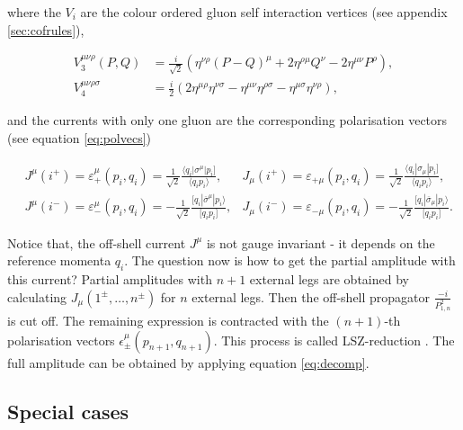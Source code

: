 \documentclass{article}
\theoremstyle{definition}
\numberwithin{equation}{section}
\begin{document}
where the $V_i$ are the colour ordered gluon self interaction vertices (see appendix \ref{sec:cofrules}),

\begin{align}
    V_3^{\mu \nu \rho}(P, Q) &= \frac{i}{\sqrt{2}} \left( \eta^{\nu \rho}\left( P - Q \right)^{\mu} + 2 \eta^{\rho \mu} Q^{\nu} - 2 \eta^{\mu \nu} P^{\rho}  \right), \\
    V_4^{\mu \nu \rho \sigma} &= \frac{i}{2} \left( 2 \eta^{\mu \rho} \eta^{\nu \sigma} - \eta^{\mu \nu} \eta^{\rho \sigma} - \eta^{\mu \sigma} \eta^{\nu \rho}  \right),
\end{align}

and the currents with only one gluon are the corresponding polarisation vectors (see equation \eqref{eq:polvecs})

\begin{subequations}
    \begin{align}
        &J^{\mu}(i^{+}) = \varepsilon_{+}^{\mu}(p_i,q_i) = \frac{1}{\sqrt{2}} \frac{ \langle q_i | \sigma^{\mu} | p_i \rbrack }{ \langle q_i p_i \rangle }, 
        &J_{\mu}(i^{+}) = \varepsilon_{+\mu}(p_i,q_i) = \frac{1}{\sqrt{2}} \frac{ \langle q_i | \sigma_{\mu} | p_i \rbrack }{ \langle q_i p_i \rangle }, \label{eq:rec_end_a} \\
        &J^{\mu}(i^{-}) = \varepsilon_{-}^{\mu}(p_i,q_i) = - \frac{1}{\sqrt{2}} \frac{ \lbrack q_i | \overline{\sigma}^{\mu} | p_i \rangle }{ \lbrack q_i p_i \rbrack }, 
        &J_{\mu}(i^{-}) = \varepsilon_{-\mu}(p_i,q_i) = - \frac{1}{\sqrt{2}} \frac{ \lbrack q_i | \overline{\sigma}_{\mu} | p_i \rangle }{ \lbrack q_i p_i \rbrack }. \label{eq:rec_end_b}
    \end{align}
\end{subequations}

Notice that, the off-shell current $J^{\mu}$ is not gauge invariant - it depends on the reference momenta $q_i$. The question now is how to get the partial amplitude with this current? Partial amplitudes with $n+1$ external legs are obtained by calculating $J_{\mu}(1^{\pm}, \dots, n^{\pm})$ for $n$ external legs. Then the off-shell propagator $\frac{-i}{P_{1,n}^2}$ is cut off. The remaining expression is contracted with the $(n+1)$-th polarisation vectors $\epsilon_{\pm}^\mu(p_{n+1}, q_{n+1})$. This process is called LSZ-reduction \cite{lsz55}. The full amplitude can be obtained by applying equation \eqref{eq:decomp}.

\subsection{Special cases}
\end{document}
